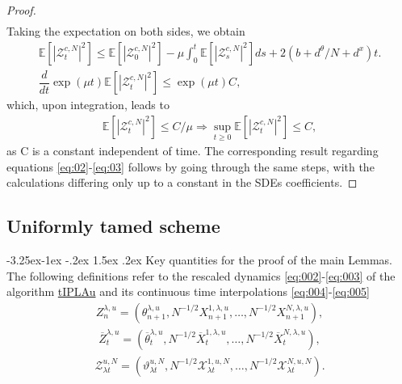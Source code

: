 \documentclass[a4paper, 10pt]{article}
\makeatletter
\theoremstyle{plain}%
\renewcommand\subsubsection{\@startsection{subsubsection}{3}{\z@}%
  {-3.25ex\@plus -1ex \@minus -.2ex}%
  {1.5ex \@plus .2ex}%
  {\normalfont\small\itshape\mdseries}}
\makeatother
\begin{document}
\begin{proof}
\begin{align*}
\end{align*}Taking the expectation on both sides, we obtain
\begin{gather*}
\mathbb{E}\left[|\mathcal{Z}_{t}^{c,N}|^2\right]\leq \mathbb{E}\left[|\mathcal{Z}_{0}^{c,N}|^2\right]-\mu\int_0^t \mathbb{E}\left[|\mathcal{Z}_{s}^{c,N}|^2\right]ds+2(b+d^{\theta}/N+d^x)t.\\
    \dfrac{d}{dt}\exp{(\mu t)}\mathbb{E}\left[|\mathcal{Z}_{t}^{c,N}|^2\right]\leq \exp{(\mu t)}C,
\end{gather*}
which, upon integration, leads to
\begin{align*}
    \mathbb{E}\left[|\mathcal{Z}_{t}^{c,N}|^2\right]\leq C/\mu\Rightarrow\sup_{t\geq 0}\mathbb{E}\left[|\mathcal{Z}_{t}^{c,N}|^2\right]\leq C,
\end{align*}
as C is a constant independent of time. The corresponding result regarding equations \eqref{eq:02}-\eqref{eq:03} follows by going through the same steps, with the calculations differing only up to a constant in the SDEs coefficients.
\end{proof}
\subsection{Uniformly tamed scheme }\label{appendix1}
\subsubsection{Key quantities for the proof of the main Lemmas.}
The following definitions refer to the rescaled dynamics \eqref{eq:002}-\eqref{eq:003} of the algorithm \hyperref[algo1]{tIPLAu} and its continuous time interpolations \eqref{eq:004}-\eqref{eq:005} \begin{align} Z^{\lambda,u}_{n}=\left(\theta_{n+1}^{\lambda,u},N^{-1/2}X_{n+1}^{1,\lambda,u},\ldots,N^{-1/2}X_{n+1}^{N,\lambda,u}\right),\label{rescale1}\end{align}
\begin{align} \overline{Z}^{\lambda,u}_t=\left(\overline{\theta}^{\lambda,u}_t,N^{-1/2}\overline{X}^{1,\lambda,u}_t,\ldots,N^{-1/2}\overline{X}^{N,\lambda,u}_t\right),\label{rescale31}\end{align}
\begin{align} \mathcal{Z}_{\lambda t}^{u,N}=\left(\vartheta_{\lambda t}^{u,N},N^{-1/2}\mathcal{X}_{\lambda t}^{1,u,N},\ldots,N^{-1/2}\mathcal{X}_{\lambda t}^{N,u,N}\right).\label{rescale21} \end{align}
\end{document}
